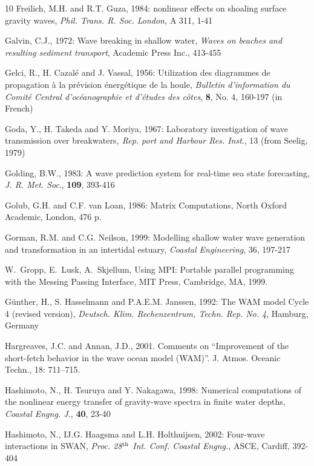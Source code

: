 \documentclass[12pt]{book}
\begin{document}
\begin{thebibliography}{10}
Freilich, M.H. and R.T. Guza, 1984: nonlinear effects on shoaling surface gravity waves, {\it Phil. Trans. R.
Soc. London, }A 311, 1-41

Galvin, C.J., 1972: Wave breaking in shallow water, {\it Waves on beaches and resulting sediment transport},
Academic Press Inc., 413-455

Gelci, R., H. Cazal\'{e} and J. Vassal, 1956: Utilization des diagrammes de propagation \`{a} la pr\'{e}vision
\'{e}nerg\'{e}tique de la houle, {\it Bulletin d'information du Comit\'{e} Central d'oc\'{e}anographie et d'\'{e}tudes
des c\^{o}tes}, {\bf 8}, No. 4, 160-197 (in French)

Goda, Y., H. Takeda and Y. Moriya, 1967: Laboratory investigation of wave transmission over breakwaters{\it ,
Rep. port and Harbour Res. Inst}., 13 (from Seelig, 1979)

Golding, B.W., 1983: A wave prediction system for real-time sea state forecasting, {\it J. R. Met. Soc}., {\bf 109},
393-416

Golub, G.H. and C.F. van Loan, 1986: Matrix Computations, North Oxford Academic, London, 476 p.

Gorman, R.M. and C.G. Neilson, 1999: Modelling shallow water wave generation and transformation in
an intertidal estuary, {\it Coastal Engineering}, 36, 197-217

W.~Gropp, E.~Lusk, A.~Skjellum, Using {MPI}: {P}ortable parallel programming
  with the {M}essing {P}assing {I}nterface, MIT Press, Cambridge, MA, 1999.

G\"{u}nther, H., S. Hasselmann and P.A.E.M. Janssen, 1992: The WAM model Cycle 4 (revised version),
{\it Deutsch. Klim. Rechenzentrum, Techn. Rep. No. 4}, Hamburg, Germany

Hargreaves, J.C. and Annan, J.D., 2001. Comments on ``{I}mprovement of the short-fetch behavior
  in the wave ocean model ({WAM})''. J. Atmos. Oceanic Techn., 18: 711--715.

Hashimoto, N., H. Tsuruya and Y. Nakagawa, 1998: Numerical computations of the nonlinear energy
transfer of gravity-wave spectra in finite water depths, {\it Coastal Engng. J.}, {\bf 40}, 23-40

Hashimoto, N., IJ.G. Haagsma and L.H. Holthuijsen, 2002: Four-wave interactions in SWAN, {\it Proc. 28$^{{\rm th}}$
Int. Conf. Coastal Engng.}, ASCE, Cardiff, 392-404


\end{thebibliography}
\end{document}
